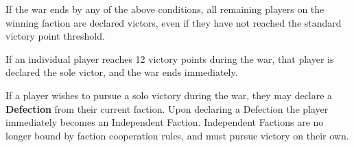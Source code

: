 \documentclass[12pt]{report}
\begin{document}
If the war ends by any of the above conditions, all remaining players on the winning faction are declared victors, even if they have not reached the standard victory point threshold.

If an individual player reaches 12 victory points during the war, that player is declared the sole victor, and the war ends immediately.

\begin{notebox}
  If a player wishes to pursue a solo victory during the war, they may declare a \textbf{Defection} from their current faction. Upon declaring a Defection the player immediately becomes an Independent Faction. Independent Factions are no longer bound by faction cooperation rules, and must pursue victory on their own.
\end{notebox}
\end{document}

